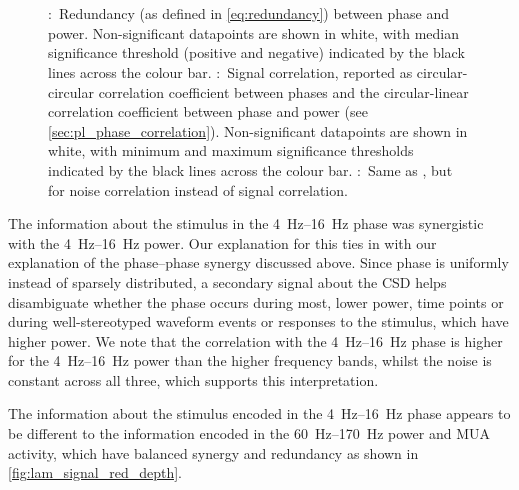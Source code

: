 \begin{figure}[htbp]
\centering
{}
\\
\\
\caption{
\protect{}:~Redundancy (as defined in \autoref{eq:redundancy}) between phase and power.
Non-significant datapoints are shown in white, with median significance threshold (positive and negative) indicated by the black lines across the colour bar.
\protect{}:~Signal correlation, reported as circular-circular correlation coefficient between phases and the circular-linear correlation coefficient between phase and power (see \autoref{sec:pl_phase_correlation}).
Non-significant datapoints are shown in white, with minimum and maximum significance thresholds indicated by the black lines across the colour bar.
\protect{}:~Same as \protect{}, but for noise correlation instead of signal correlation.
}
\label{fig:lam_noisesignal_corr_depth}
\end{figure}


The information about the stimulus in the \SIrange{4}{16}{Hz} phase was synergistic with the \SIrange{4}{16}{Hz} power.
Our explanation for this ties in with our explanation of the phase--phase synergy discussed above.
Since phase is uniformly instead of sparsely distributed, a secondary signal about the \ac{CSD} helps disambiguate whether the phase occurs during most, lower power, time points or during well-stereotyped waveform events or responses to the stimulus, which have higher power.
We note that the correlation with the \SIrange{4}{16}{Hz} phase is higher for the \SIrange{4}{16}{Hz} power than the higher frequency bands, whilst the noise is constant across all three, which supports this interpretation.

The information about the stimulus encoded in the \SIrange{4}{16}{Hz} phase appears to be different to the information encoded in the \SIrange{60}{170}{Hz} power and \ac{MUA} activity, which have balanced synergy and redundancy as shown in \autoref{fig:lam_signal_red_depth}.



